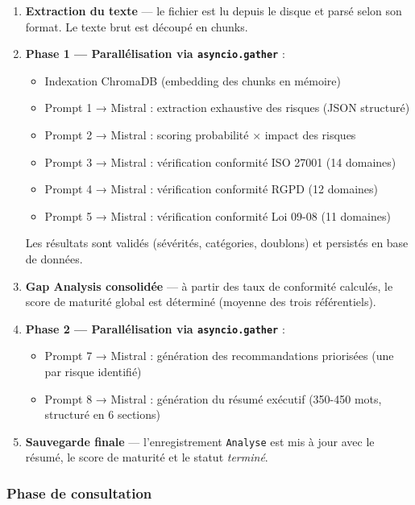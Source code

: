 \begin{enumerate}
  \item \textbf{Extraction du texte} — le fichier est lu depuis le disque
    et parsé selon son format. Le texte brut est découpé en chunks.

  \item \textbf{Phase 1 — Parallélisation via \texttt{asyncio.gather}} :
    \begin{itemize}
      \item Indexation ChromaDB (embedding des chunks en mémoire)
      \item Prompt 1 → Mistral : extraction exhaustive des risques
        (JSON structuré)
      \item Prompt 2 → Mistral : scoring probabilité × impact des risques
      \item Prompt 3 → Mistral : vérification conformité ISO 27001
        (14 domaines)
      \item Prompt 4 → Mistral : vérification conformité RGPD (12 domaines)
      \item Prompt 5 → Mistral : vérification conformité Loi 09-08
        (11 domaines)
    \end{itemize}
    Les résultats sont validés (sévérités, catégories, doublons) et
    persistés en base de données.

  \item \textbf{Gap Analysis consolidée} — à partir des taux de conformité
    calculés, le score de maturité global est déterminé (moyenne des
    trois référentiels).

  \item \textbf{Phase 2 — Parallélisation via \texttt{asyncio.gather}} :
    \begin{itemize}
      \item Prompt 7 → Mistral : génération des recommandations priorisées
        (une par risque identifié)
      \item Prompt 8 → Mistral : génération du résumé exécutif
        (350-450 mots, structuré en 6 sections)
    \end{itemize}

  \item \textbf{Sauvegarde finale} — l'enregistrement \texttt{Analyse}
    est mis à jour avec le résumé, le score de maturité et le statut
    \textit{terminé}.
\end{enumerate}

\subsubsection*{Phase de consultation}

